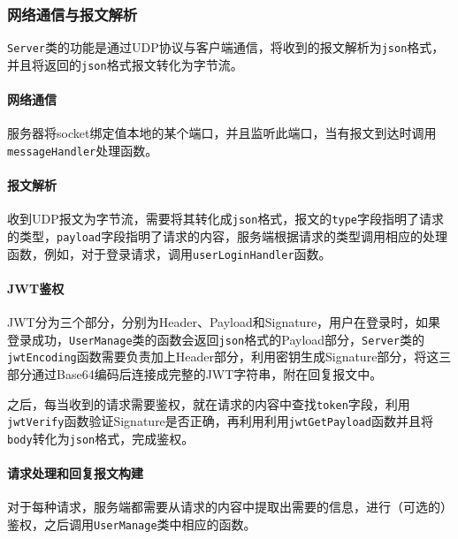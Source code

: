 \documentclass[lang=cn,11pt,a4paper,cite=authornum]{paper}
\begin{document}
\subsubsection{网络通信与报文解析}

\texttt{Server}类的功能是通过UDP协议与客户端通信，将收到的报文解析为\texttt{json}格式，并且将返回的\texttt{json}格式报文转化为字节流。

\paragraph{网络通信}

服务器将socket绑定值本地的某个端口，并且监听此端口，当有报文到达时调用\texttt{messageHandler}处理函数。

\paragraph{报文解析}

收到UDP报文为字节流，需要将其转化成\texttt{json}格式，报文的\texttt{type}字段指明了请求的类型，\texttt{payload}字段指明了请求的内容，服务端根据请求的类型调用相应的处理函数，例如，对于登录请求，调用\texttt{userLoginHandler}函数。

\paragraph{JWT鉴权}

\label{JWT}JWT分为三个部分，分别为Header、Payload和Signature，用户在登录时，如果登录成功，\texttt{UserManage}类的函数会返回\texttt{json}格式的Payload部分，\texttt{Server}类的\texttt{jwtEncoding}函数需要负责加上Header部分，利用密钥生成Signature部分，将这三部分通过Base64编码后连接成完整的JWT字符串，附在回复报文中。

之后，每当收到的请求需要鉴权，就在请求的内容中查找\texttt{token}字段，利用\texttt{jwtVerify}函数验证Signature是否正确，再利用利用\texttt{jwtGetPayload}函数并且将\texttt{body}转化为\texttt{json}格式，完成鉴权。

\paragraph{请求处理和回复报文构建}

对于每种请求，服务端都需要从请求的内容中提取出需要的信息，进行（可选的）鉴权，之后调用\texttt{UserManage}类中相应的函数。
\end{document}
